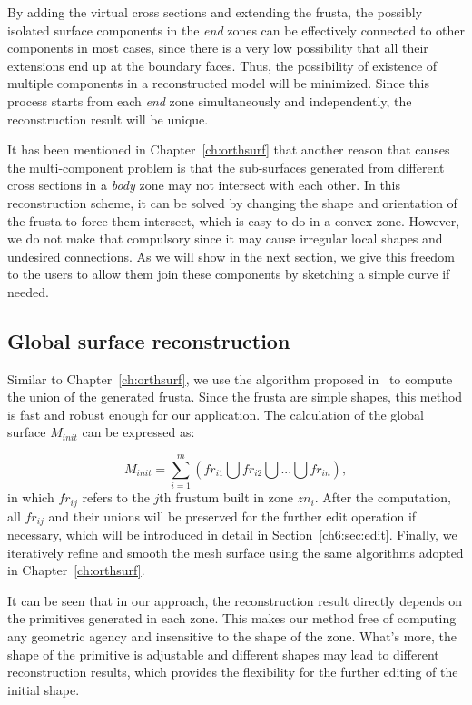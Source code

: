 By adding the  virtual cross sections and extending the frusta, the
possibly isolated surface components in the \textit{end} zones can
be effectively connected to other components in most cases, since
there is a very low possibility that all their extensions end up at
the boundary faces. Thus, the possibility of existence of multiple
components in a reconstructed model will be minimized. Since this
process starts from each \textit{end} zone simultaneously and
independently, the reconstruction result will be unique.

It has been mentioned  in Chapter~\ref{ch:orthsurf} that another
reason that causes the multi-component problem is that the
sub-surfaces generated from different cross sections in a
\textit{body} zone may not intersect with each other. In this
reconstruction scheme, it can be solved by changing the shape and
orientation of the frusta to force them intersect, which is easy to
do in a convex zone. However, we do not make that compulsory since
it may cause irregular local shapes and undesired connections. As we
will show in the next section, we give this freedom to the users to
allow them join these components by sketching a simple curve if
needed.



\subsection{Global surface reconstruction}
\label{ch6:sec:reconst:global}

Similar to Chapter~\ref{ch:orthsurf},  we use the algorithm proposed
in~\cite{LTH86} to compute the union of the generated frusta. Since
the frusta are simple shapes, this method is fast and robust enough
for our application. The calculation of the global surface
$M_{init}$ can be expressed as:

\begin{equation}
\label{eq:surfreconst}
    M_{init}=\sum\limits_{i=1}^m {(fr_{i1} \bigcup fr_{i2} \bigcup {...} \bigcup fr_{in})},
\end{equation}
in which $fr_{ij}$ refers to the  $j$th frustum built in zone
$zn_i$. After the computation, all $fr_{ij}$ and their unions will
be preserved for the further edit operation if necessary, which will
be introduced in detail in Section~\ref{ch6:sec:edit}. Finally, we
iteratively refine and smooth the mesh surface using the same
algorithms adopted in Chapter~\ref{ch:orthsurf}.

It can be seen that in our  approach, the reconstruction result
directly depends on the primitives generated in each zone. This
makes our method free of computing any geometric agency and
insensitive to the shape of the zone. What's more, the shape of the
primitive is adjustable and different shapes may lead to different
reconstruction results, which provides the flexibility for the
further editing of the initial shape.

